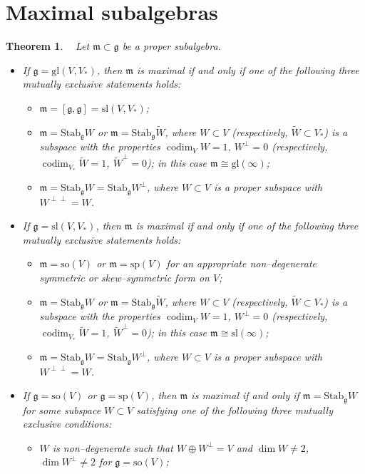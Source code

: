 \documentclass[oneside,leqno,12pt]{article}
\newcounter{theorem}
\newtheorem{theo}{Theorem}[section]
\def\gg{\mathfrak{g}}
\def\gm{\mathfrak{m}}
\DeclareMathOperator{\codim}{codim}
\newcommand{\mm}{\mathfrak{m}}
\renewcommand{\gg}{\mathfrak{g}}
\newcommand{\Stab}{\mathrm{Stab}}
\renewcommand{\sp}{\mathrm{sp}}
\newcommand{\gl}{\mathrm{gl}}
\renewcommand{\sl}{\mathrm{sl}}
\newcommand{\so}{\mathrm{so}}
\begin{document}
\section{Maximal subalgebras}
\begin{theo}$\phantom{x}$ \newline
Let $\mm\subset\gg$ be a proper subalgebra. 
\begin{itemize}
\item[\rm{(i)}] If $\gg=\gl(V, V_*)$, then $\gm$ is maximal if and only if  one of the following three mutually exclusive statements holds:
\begin{itemize}
\item[\rm{(ia)}] $\mm=[\gg,\gg]= \sl(V, V_*)$;
\item[\rm{(ib)}] $\mm=\Stab_\gg W$ or $\mm=\Stab_\gg \tilde W$, where $W\subset V$ (respectively, $\tilde W\subset V_*$) is a subspace with the properties $\codim_VW=1$, $W^\perp=0$ (respectively, $\codim_{V_*}\tilde W=1$, $\tilde W^\perp=0$);
in this case $\gm \cong \gl(\infty)$;
\item[\rm{(ic)}] $\mm=\Stab_\gg W=\Stab_\gg W^\perp$, where $W\subset V$ is a proper subspace with $W^{\perp\perp}=W$.
\end{itemize}
\item[\rm{(ii)}] If $\gg=\sl(V,V_*)$, then $\gm$ is maximal if and only if  one of the following three mutually exclusive statements holds:
\begin{itemize}
\item[\rm{(iia)}] $\mm = \so(V)$ or $\gm = \sp(V)$ for an appropriate non--degenerate symmetric or skew--symmetric form on $V$;
\item[\rm{(iib)}] $\mm=\Stab_\gg W$ or $\mm=\Stab_\gg \tilde W$, where $W\subset V$ (respectively, $\tilde W\subset V_*$) is a subspace with the properties $\codim_VW=1$, $W^\perp=0$ (respectively, $\codim_{V_*}\tilde W=1$, $\tilde W^\perp=0$);
in this case $\gm \cong \sl(\infty)$;
\item[\rm{(iic)}] $\mm=\Stab_\gg W=\Stab_\gg W^\perp$, where $W\subset V$ is a proper subspace with $W^{\perp\perp}=W$.
\end{itemize}
\item[\rm{(iii)}]  If $\gg=\so(V)$ or $\gg = \sp(V)$, then $\gm$ is maximal if and only if  $\mm=\Stab_\gg W$ for some subspace $W \subset V$ satisfying one
 of the following three mutually exclusive conditions:
\begin{itemize}
\item[\rm{(iiia)}] $W$ is non--degenerate such that  $W \oplus W^\perp = V$ and $\dim W \neq 2$, $\dim W^\perp \neq 2$ for $\gg = \so(V)$; 

\end{itemize}
\end{itemize}
\end{theo}
\end{document}
